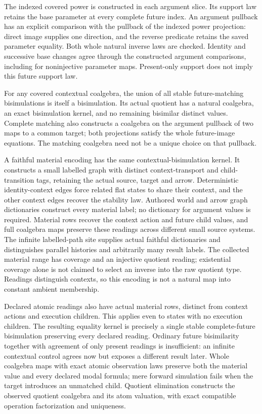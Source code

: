 \documentclass[11pt]{article}
\theoremstyle{definition}
\theoremstyle{remark}
\begin{document}
The indexed covered power is constructed in each argument slice.  Its
support law retains the base parameter at every complete future index.
An argument pullback has an explicit comparison with the pullback of
the indexed power projection: direct image supplies one direction,
and the reverse predicate retains the saved parameter equality.
Both whole natural inverse laws are checked.  Identity and successive
base changes agree through the constructed argument comparisons,
including for noninjective parameter maps.  Present-only support does
not imply this future support law.

For any covered contextual coalgebra, the union of all stable
future-matching bisimulations is itself a bisimulation.  Its actual
quotient has a natural coalgebra, an exact bisimulation kernel, and no
remaining bisimilar distinct values.  Complete matching also constructs
a coalgebra on the argument pullback of two maps to a common target;
both projections satisfy the whole future-image equations.  The
matching coalgebra need not be a unique choice on that pullback.

A faithful material encoding has the same contextual-bisimulation kernel.
It constructs a small labelled graph with distinct context-transport and
child-transition tags, retaining the actual source, target and arrow.
Deterministic identity-context edges force related flat states to share
their context, and the other context edges recover the stability law.
Authored world and arrow graph dictionaries construct every material
label; no dictionary for argument values is required.  Material rows
recover the context action and future child values, and full coalgebra
maps preserve these readings across different small source systems.
The infinite labelled-path site supplies actual faithful dictionaries
and distinguishes parallel histories and arbitrarily many result labels.
The collected material range has coverage and an injective quotient
reading; existential coverage alone is not claimed to select an inverse
into the raw quotient type.  Readings distinguish contexts, so this
encoding is not a natural map into constant ambient membership.

Declared atomic readings also have actual material rows, distinct from
context actions and execution children.  This applies even to states with
no execution children.  The resulting equality kernel is precisely a
single stable complete-future bisimulation preserving every declared
reading.  Ordinary future bisimilarity together with agreement of only
present readings is insufficient: an infinite contextual control agrees
now but exposes a different result later.  Whole coalgebra maps with
exact atomic observation laws preserve both the material value and every
declared modal formula; mere forward simulation fails when the target
introduces an unmatched child.  Quotient elimination constructs the
observed quotient coalgebra and its atom valuation, with exact compatible
operation factorization and uniqueness.
\end{document}
